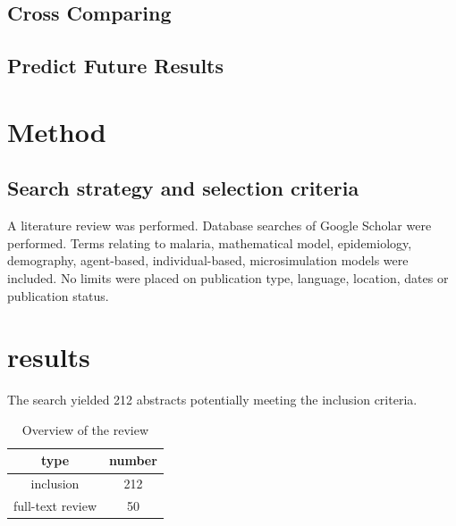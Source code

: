 \documentclass[a4paper, 12pt, twoside]{article}
\begin{document}
\subsection{Cross Comparing}
\subsection{Predict Future Results}

\section{Method}%
\label{sec:method}
\subsection{Search strategy and selection criteria}
A literature review was performed.
Database searches of Google Scholar were performed.
Terms relating to malaria, mathematical model, epidemiology, demography, agent-based, individual-based, microsimulation models were included. No limits were placed on publication type, language, location, dates or publication status.

\section{results}%
\label{sec:results}
The search yielded 212 abstracts potentially meeting the inclusion criteria.

\begin{table}
	\centering
	\label{tab:overview_of_the_review}
	\begin{tabular}{c S}
		\toprule
		type             & {number} \\
		\midrule
		inclusion        & 212      \\
		full-text review & 50       \\
		\bottomrule
	\end{tabular}
	\caption{Overview of the review}
\end{table}

\appendix
\printglossaries
\printnomenclature


\end{document}
